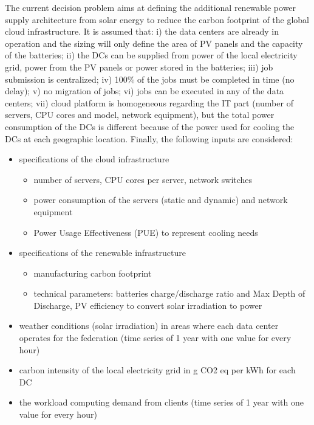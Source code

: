 The current decision problem aims at defining the additional renewable power supply architecture from solar energy to reduce the carbon footprint of the global cloud infrastructure. It is assumed that: i) the data centers are already in operation and the sizing will only define the area of PV panels and the capacity of the batteries; ii) the DCs can be supplied from power of the local electricity grid, power from the PV panels or power stored in the batteries; iii) job submission is centralized; iv) 
100\% of the jobs must be completed in time (no delay); v) no migration of jobs; vi) jobs can be executed in any of the data centers; vii) cloud platform is homogeneous regarding the IT part (number of servers, CPU cores and model, network equipment), but the total power consumption of the DCs is different because of the power used for cooling the DCs at each geographic location. Finally, the following inputs are considered:

\begin{itemize}
    \item specifications of the cloud infrastructure 
    \begin{itemize}
        \item number of servers, CPU cores per server, network switches
        \item power consumption of the servers (static and dynamic) and network equipment
        \item Power Usage Effectiveness (PUE) to represent cooling needs
    \end{itemize}
    
    \item specifications of the renewable infrastructure
    \begin{itemize}
        \item manufacturing carbon footprint
        \item technical parameters: batteries charge/discharge ratio and Max Depth of Discharge, PV efficiency to convert solar irradiation to power
    \end{itemize}
    \item weather conditions (solar irradiation) in areas where each data center operates for the federation (time series of 1 year with one value for every hour)
    \item carbon intensity of the local electricity grid in g CO2 eq per kWh for each DC
    \item the workload computing demand from clients (time series of 1 year with one value for every hour)

\end{itemize}

